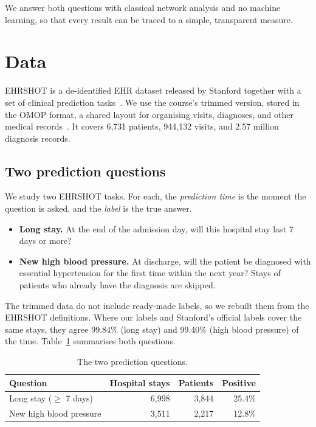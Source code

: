 \documentclass[11pt]{article}
\begin{document}
We answer both questions with classical network analysis and no machine learning, so that every result can be traced to a simple, transparent measure.

\section{Data}
\label{sec:data}

EHRSHOT is a de-identified EHR dataset released by Stanford together with a set of clinical prediction tasks~\cite{wornow2023ehrshot}. We use the course's trimmed version, stored in the OMOP format, a shared layout for organising visits, diagnoses, and other medical records~\cite{hripcsak2015ohdsi}. It covers 6,731 patients, 944,132 visits, and 2.57 million diagnosis records.

\subsection{Two prediction questions}

We study two EHRSHOT tasks. For each, the \emph{prediction time} is the moment the question is asked, and the \emph{label} is the true answer.
\begin{itemize}
  \item \textbf{Long stay.} At the end of the admission day, will this hospital stay last 7 days or more?
  \item \textbf{New high blood pressure.} At discharge, will the patient be diagnosed with essential hypertension for the first time within the next year? Stays of patients who already have the diagnosis are skipped.
\end{itemize}
The trimmed data do not include ready-made labels, so we rebuilt them from the EHRSHOT definitions. Where our labels and Stanford's official labels cover the same stays, they agree 99.84\% (long stay) and 99.40\% (high blood pressure) of the time. Table~\ref{tab:labels} summarises both questions.

\begin{table}[!htbp]
\centering
\caption{The two prediction questions.}
\label{tab:labels}
\begin{tabular}{lrrr}
\toprule
Question & Hospital stays & Patients & Positive \\
\midrule
Long stay ($\geq$ 7 days) & 6,998 & 3,844 & 25.4\% \\
New high blood pressure   & 3,511 & 2,217 & 12.8\% \\
\bottomrule
\end{tabular}
\end{table}
\end{document}
